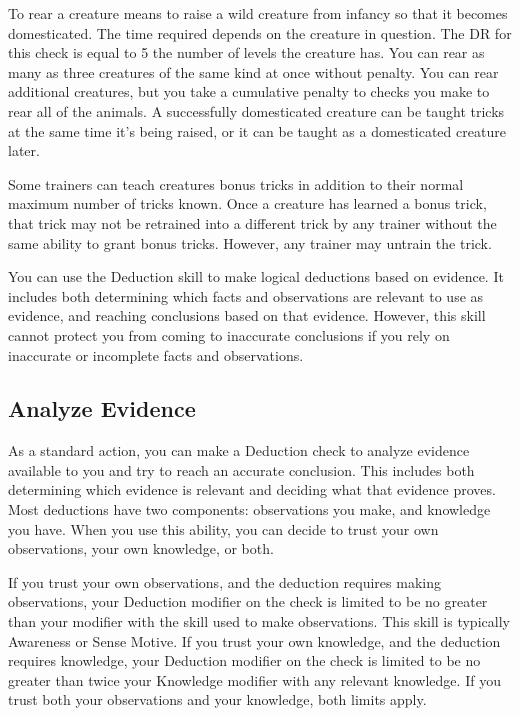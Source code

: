         To rear a creature means to raise a wild creature from infancy so that it becomes domesticated. The time required depends on the creature in question. The DR for this check is equal to 5 \add the number of levels the creature has. You can rear as many as three creatures of the same kind at once without penalty. You can rear additional creatures, but you take a cumulative  penalty to checks you make to rear all of the animals. A successfully domesticated creature can be taught tricks at the same time it's being raised, or it can be taught as a domesticated creature later.

        \label{Bonus Tricks} Some trainers can teach creatures bonus tricks in addition to their normal maximum number of tricks known.
        Once a creature has learned a bonus trick, that trick may not be retrained into a different trick by any trainer without the same ability to grant bonus tricks.
        However, any trainer may untrain the trick.

\newpage
{}
    You can use the Deduction skill to make logical deductions based on evidence.
    It includes both determining which facts and observations are relevant to use as evidence, and reaching conclusions based on that evidence.
    However, this skill cannot protect you from coming to inaccurate conclusions if you rely on inaccurate or incomplete facts and observations.

    \subsection{Analyze Evidence}
        As a standard action, you can make a Deduction check to analyze evidence available to you and try to reach an accurate conclusion.
        This includes both determining which evidence is relevant and deciding what that evidence proves.
        Most deductions have two components: observations you make, and knowledge you have.
        When you use this ability, you can decide to trust your own observations, your own knowledge, or both.

        If you trust your own observations, and the deduction requires making observations, your Deduction modifier on the check is limited to be no greater than your modifier with the skill used to make observations.
        This skill is typically Awareness or Sense Motive.
        If you trust your own knowledge, and the deduction requires knowledge, your Deduction modifier on the check is limited to be no greater than twice your Knowledge modifier with any relevant knowledge.
        If you trust both your observations and your knowledge, both limits apply.

